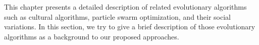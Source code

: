 \label{chapter:newsol}
This chapter presents a detailed description of related evolutionary algorithms such as cultural algorithms, particle swarm optimization, and their social variations. In this section, we try to give a brief description of those evolutionary algorithms as a background to our proposed approaches.




